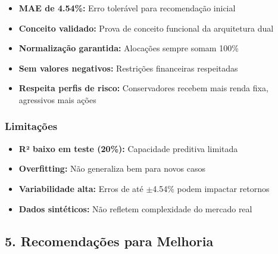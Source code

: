 \documentclass[12pt]{article}
\begin{document}
\begin{itemize}
    \item \textbf{MAE de 4.54\%:} Erro tolerável para recomendação inicial
    \item \textbf{Conceito validado:} Prova de conceito funcional da arquitetura dual
    \item \textbf{Normalização garantida:} Alocações sempre somam 100\%
    \item \textbf{Sem valores negativos:} Restrições financeiras respeitadas
    \item \textbf{Respeita perfis de risco:} Conservadores recebem mais renda fixa, agressivos mais ações
\end{itemize}

\subsubsection*{Limitações}

\begin{itemize}
    \item \textbf{R² baixo em teste (20\%):} Capacidade preditiva limitada
    \item \textbf{Overfitting:} Não generaliza bem para novos casos
    \item \textbf{Variabilidade alta:} Erros de até $\pm$4.54\% podem impactar retornos
    \item \textbf{Dados sintéticos:} Não refletem complexidade do mercado real
\end{itemize}

\subsection*{5. Recomendações para Melhoria}
\end{document}
